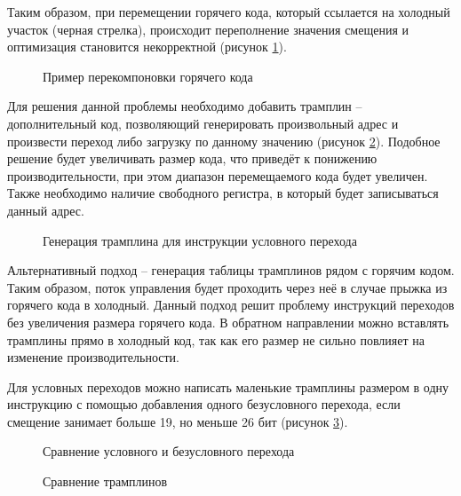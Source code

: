 Таким образом, при перемещении горячего кода, который ссылается на холодный участок (черная стрелка), происходит переполнение значения смещения и оптимизация становится некорректной (рисунок \cref{fig:HotMove}).

\begin{figure}[ht]
    \centerfloat{
        \texttt{[image: 11]}
    }
    \caption{Пример перекомпоновки горячего кода}\label{fig:HotMove}
\end{figure}

Для решения данной проблемы необходимо добавить трамплин – дополнительный код, позволяющий генерировать произвольный адрес и произвести переход либо загрузку по данному значению (рисунок \cref{fig:Tramp}). Подобное решение будет увеличивать размер кода, что приведёт к понижению производительности, при этом диапазон перемещаемого кода будет увеличен. Также необходимо наличие свободного регистра, в который будет записываться данный адрес.

\begin{figure}[ht]
    \caption{Генерация трамплина для инструкции условного перехода}\label{fig:Tramp}
\end{figure}

Альтернативный подход – генерация таблицы трамплинов рядом с горячим кодом. Таким образом, поток управления будет проходить через неё в случае прыжка из горячего кода в холодный. Данный подход решит проблему инструкций переходов без увеличения размера горячего кода. В обратном направлении можно вставлять трамплины прямо в холодный код, так как его размер не сильно повлияет на изменение производительности.

Для условных переходов можно написать маленькие трамплины размером в одну инструкцию с помощью добавления одного безусловного перехода, если смещение занимает больше 19, но меньше 26 бит (рисунок \cref{fig:CmpBranch}).

\begin{figure}[ht]
    \caption{Сравнение условного и безусловного перехода}\label{fig:CmpBranch}
\end{figure}

\begin{figure}[ht]
    \caption{Сравнение трамплинов}\label{fig:CmpTramp}
\end{figure}

